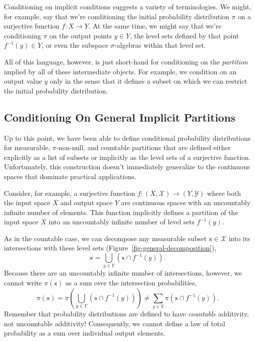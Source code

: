 \documentclass[
  letterpaper,
  DIV=11,
  numbers=noendperiod]{scrartcl}
\begin{document}
Conditioning on implicit conditions suggests a variety of terminologies.
We might, for example, say that we're conditioning the initial
probability distribution \(\pi\) on a surjective function
\(f : X \rightarrow Y\). At the same time, we might say that we're
conditioning \(\pi\) on the output points \(y \in Y\), the level sets
defined by that point \(f^{-1}(y) \in Y\), or even the subspace
\(\sigma\)-algebras within that level set.

All of this language, however, is just short-hand for conditioning on
the \emph{partition} implied by all of these intermediate objects. For
example, we condition on an output value \(y\) only in the sense that it
defines a subset on which we can restrict the initial probability
distribution.

\subsection{Conditioning On General Implicit
Partitions}\label{sec:general-conditional}

Up to this point, we have been able to define conditional probability
distributions for measurable, \(\pi\)-non-null, and countable partitions
that are defined either explicitly as a list of subsets or implicitly as
the level sets of a surjective function. Unfortunately, this
construction doesn't immediately generalize to the continuous spaces
that dominate practical applications.

Consider, for example, a surjective function
\(f: (X, \mathcal{X}) \rightarrow (Y, \mathcal{Y})\) where both the
input space \(X\) and output space \(Y\) are continuous spaces with an
uncountably infinite number of elements. This function implicitly
defines a partition of the input space \(X\) into an uncountably
infinite number of level sets \(f^{-1}(y)\).

As in the countable case, we can decompose any measurable subset
\(\mathsf{x} \in \mathcal{X}\) into its intersections with these level
sets (Figure~\ref{fig-general-decomposition}), \[
\mathsf{x}
=
\bigcup_{y \in Y} \left( \mathsf{x} \cap f^{-1}(y) \right).
\] Because there are an uncountably infinite number of intersections,
however, we cannot write \(\pi(\mathsf{x})\) as a sum over the
intersection probabilities, \[
\pi( \mathsf{x} )
=
\pi \left( \bigcup_{y \in Y}
           \left( \mathsf{x} \cap f^{-1}(y) \right) \right)
\ne
\sum_{y \in Y} \pi( \mathsf{x} \cap f^{-1}(y) ).
\] Remember that probability distributions are defined to have
\emph{countable} additivity, not uncountable additivity! Consequently,
we cannot define a law of total probability as a sum over individual
output elements.
\end{document}
